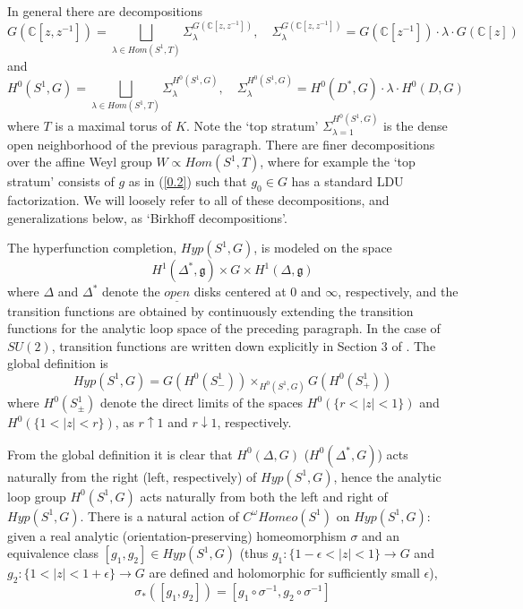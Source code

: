 \documentclass{amsart}
\theoremstyle{conjecture}
\theoremstyle{definition}
\theoremstyle{question}
\theoremstyle{questions}
\theoremstyle{remark}
\theoremstyle{remarks}
\theoremstyle{example}
\numberwithin{equation}{section}
\begin{document}
In general there are decompositions
\begin{equation}\label{Birkhoff1}G(\mathbb C[z,z^{-1}])=\bigsqcup_{\lambda \in
Hom(S^1,T)}\Sigma_{\lambda}^{G(\mathbb C[z,z^{-1}])},\quad
\Sigma_{\lambda}^{G(\mathbb C[z,z^{-1}])}=G(\mathbb
C[z^{-1}])\cdot\lambda\cdot G(\mathbb C[z])\end{equation} and
\begin{equation}\label{Birkhoff2}H^0(S^1,G)=\bigsqcup_{\lambda\in
Hom(S^1,T)}\Sigma_{\lambda}^{H^0(S^1,G)},\quad
\Sigma_{\lambda}^{H^0(S^1,G)}= H^0(D^*,G)\cdot\lambda\cdot
H^0(D,G)\end{equation}
where $T$ is a maximal torus of $K$. Note the `top stratum' $\Sigma_{\lambda=1}^{H^0(S^1,G)}$
is the dense open neighborhood of the previous paragraph. There are finer decompositions
over the affine Weyl group $W\propto Hom(S^1,T)$, where for example the `top stratum' consists of
$g$ as in (\ref{0.2}) such that $g_0\in G$ has a standard LDU factorization. We will loosely refer to all
of these decompositions, and generalizations below, as `Birkhoff decompositions'.

The hyperfunction completion, $Hyp(S^1,G)$, is modeled on the
space
$$H^1(\Delta^{*},\mathfrak g)\times G\times H^1(\Delta ,\mathfrak g)$$
where $\Delta$ and $\Delta^{*}$ denote the
$\underline {open}$ disks centered at $ 0$ and $\infty$,
respectively, and the transition functions are obtained by
continuously extending the transition functions for the analytic
loop space of the preceding paragraph. In the case of $SU(2)$, transition
functions are written down explicitly in Section 3 of \cite{Pi2}.  The global definition is
$$Hyp(S^1,G)=G(H^0(S^1_{-}))\times_{H^0(S^1,G)}G(H^0(S^1_{+}))$$
where $H^0(S^1_{\pm})$ denote the direct limits of the spaces
$H^0(\{r<\vert z\vert <1\})$ and $H^0(\{1<\vert z\vert <r\})$, as
$ r\uparrow 1$ and $r\downarrow 1$, respectively.


From the global
definition it is clear that $H^0(\Delta,G)$ ($H^0(\Delta^*,G)$) acts naturally
from the right (left, respectively) of $Hyp(S^1,G)$, hence the analytic loop group
$H^0(S^1,G)$ acts naturally
from both the left and right of $Hyp(S^1,G)$. There is a natural action
of $C^{\omega}Homeo(S^1)$ on $Hyp(S^1,G)$:
given a real analytic (orientation-preserving) homeomorphism $\sigma$ and
an equivalence class $[g_1,g_2]\in Hyp(S^1,G)$ (thus
$g_1:\{1-\epsilon<|z|<1\}\to G$ and $g_2:\{1<|z|<1+\epsilon\}\to G$ are defined and
holomorphic for sufficiently small $\epsilon$),
\begin{equation}\label{viraction}\sigma_*([g_1,g_2])=[g_1\circ \sigma^{-1},g_2\circ \sigma^{-1}]\end{equation}
\end{document}
